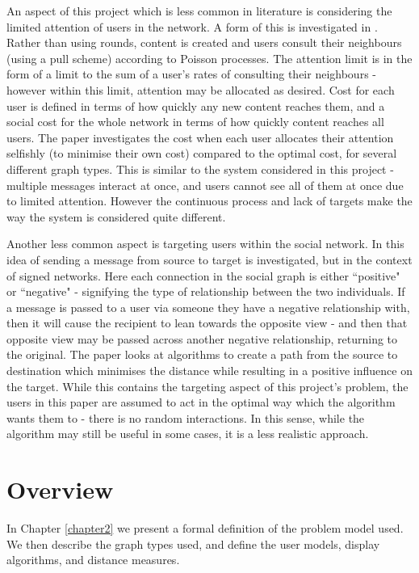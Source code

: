 \documentclass[bsc,frontabs,twoside,singlespacing,parskip,deptreport]{infthesis}     %
\begin{document}
An aspect of this project which is less common in literature is considering the limited attention of users in the network. A form of this is investigated in \cite{AllocatingAttention}. Rather than using rounds, content is created and users consult their neighbours (using a pull scheme) according to Poisson processes. The attention limit is in the form of a limit to the sum of a user's rates of consulting their neighbours - however within this limit, attention may be allocated as desired. Cost for each user is defined in terms of how quickly any new content reaches them, and a social cost for the whole network in terms of how quickly content reaches all users. The paper investigates the cost when each user allocates their attention selfishly (to minimise their own cost) compared to the optimal cost, for several different graph types. This is similar to the system considered in this project - multiple messages interact at once, and users cannot see all of them at once due to limited attention. However the continuous process and lack of targets make the way the system is considered quite different.

Another less common aspect is targeting users within the social network. In \cite{TargetedSignedNetworks} this idea of sending a message from source to target is investigated, but in the context of signed networks. Here each connection in the social graph is either ``positive" or ``negative" - signifying the type of relationship between the two individuals. If a message is passed to a user via someone they have a negative relationship with, then it will cause the recipient to lean towards the opposite view - and then that opposite view may be passed across another negative relationship, returning to the original. The paper looks at algorithms to create a path from the source to destination which minimises the distance while resulting in a positive influence on the target. While this contains the targeting aspect of this project's problem, the users in this paper are assumed to act in the optimal way which the algorithm wants them to - there is no random interactions. In this sense, while the algorithm may still be useful in some cases, it is a less realistic approach.

\section{Overview}
In Chapter \ref{chapter2} we present a formal definition of the problem model used. We then describe the graph types used, and define the user models, display algorithms, and distance measures.
\end{document}
